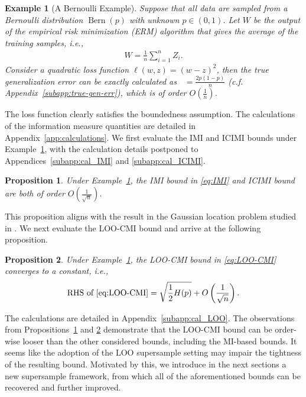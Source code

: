 \documentclass[onecolumn,romanappendices,10pt]{IEEEtran}
\newtheorem{proposition}{Proposition}
\newtheorem{example}{Example}
\DeclareMathOperator{\gen}{\overline{gen}}
\DeclareMathOperator{\Bernoulli}{Bern}
\begin{document}
	\begin{example}[A Bernoulli Example] \label{eg:Bernoulli}
		Suppose that all data are sampled from a Bernoulli distribution $\Bernoulli(p)$ with unknown $p \in (0, 1)$. Let $W$ be the output of the empirical risk minimization (ERM) algorithm that gives the average of the training samples, i.e.,
		\begin{align}
			W = \frac{1}{n} \sum_{i=1}^{n} Z_i. 
		\end{align}
		Consider a quadratic loss function $\ell(w, z) = (w - z)^2$, then the true generalization error can be exactly calculated as $\gen = \frac{2p (1-p)}{n}$ (c.f. Appendix~\ref{subapp:true-gen-err}), which is of order $O(\frac{1}{n})$.
	\end{example}
	The loss function clearly satisfies the boundedness assumption. The calculations of the information measure quantities are detailed in Appendix~\ref{app:calculations}. We first evaluate the IMI and ICIMI bounds under Example~\ref{eg:Bernoulli}, with the calculation details postponed to Appendices~\ref{subapp:cal_IMI} and \ref{subapp:cal_ICIMI}.
	\begin{proposition} \label{pro:ICIMI}
		Under Example~\ref{eg:Bernoulli}, the IMI bound in \eqref{eq:IMI} and ICIMI bound are both of order $O \left( \frac{1}{\sqrt{n}} \right)$.
	\end{proposition}
	This proposition aligns with the result in the Gaussian location problem studied in \cite{zhou2022individually}. We next evaluate the LOO-CMI bound and arrive at the following proposition. 
	\begin{proposition} \label{pro:LOO-CMI}
		Under Example~\ref{eg:Bernoulli}, the LOO-CMI bound in \eqref{eq:LOO-CMI} converges to a constant, i.e.,
		\begin{equation}
			\begin{aligned}
				\textnormal{RHS of \eqref{eq:LOO-CMI}} = \sqrt{\frac{1}{2} H(p)} + O\left( \frac{1}{\sqrt{n}} \right).
			\end{aligned}
		\end{equation}
	\end{proposition}
	The calculations are detailed in Appendix~\ref{subapp:cal_LOO}. The observations from Propositions~\ref{pro:ICIMI} and \ref{pro:LOO-CMI} demonstrate that the LOO-CMI bound can be order-wise looser than the other considered bounds, including the MI-based bounds. It seems like the adoption of the LOO supersample setting may impair the tightness of the resulting bound. Motivated by this, we introduce in the next sections a new supersample framework, from which all of the aforementioned bounds can be recovered and further improved.
	
\end{document}
